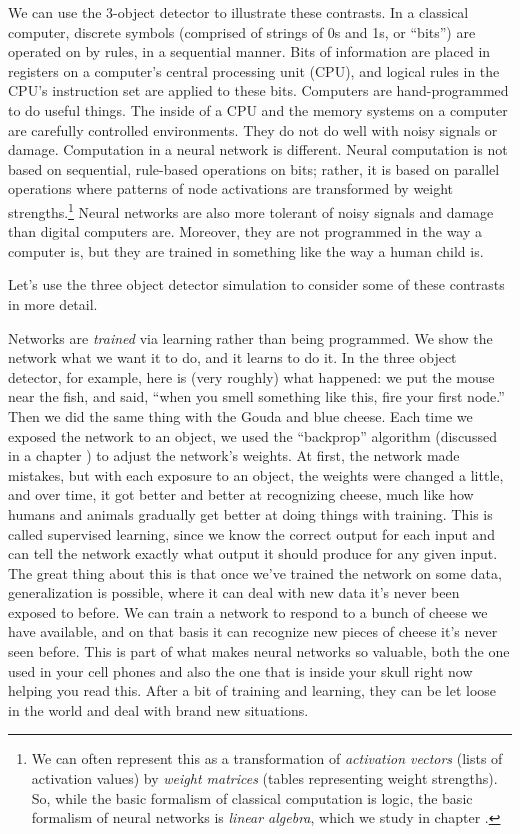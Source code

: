 We can use the 3-object detector to illustrate these contrasts. In a classical computer, discrete symbols (comprised of strings of 0s and 1s, or ``bits'') are operated on by rules, in a sequential manner. Bits of information are placed in registers on a computer's central processing unit (CPU), and logical rules in the CPU's instruction set are applied to these bits. Computers are hand-programmed to do useful things. The inside of a CPU and the memory systems on a computer are carefully controlled environments. They do not do well with noisy signals or damage. Computation in a neural network is  different. Neural computation is not based on sequential, rule-based operations on bits; rather, it is based on parallel operations where patterns of node activations are transformed by weight strengths.\footnote{We can often represent this as a transformation of \emph{activation vectors} (lists of activation values) by \emph{weight matrices} (tables representing weight strengths). So, while the basic formalism of classical computation is logic,  the basic formalism of neural networks is \emph{linear algebra}, which we study in chapter .}  Neural networks are also more tolerant of noisy signals and damage than digital computers are. Moreover, they are not programmed in the way a computer is, but they are trained in something like the way a human child is.

Let's use the three object detector simulation to consider some of these contrasts in more detail. 

Networks are \emph{trained} via learning rather than being programmed. We show the network what we want it to do, and it learns to do it. In the three object detector, for example, here is (very roughly) what happened: we put the mouse near the fish, and said, ``when you smell something like this, fire your first node.''  Then we did the same thing with the Gouda and blue cheese. Each time we exposed the network to an object, we used the ``backprop'' algorithm (discussed in a chapter ) to adjust the network's weights. At first, the network made mistakes, but with each exposure to an object, the weights were changed a little, and over time, it got better and better at recognizing cheese, much like how humans and animals gradually get better at doing things with training. This is called supervised learning, since we know the correct output for each input and can tell the network exactly what output it should produce for any given input. The great thing about this is that once we've trained the network on some data, generalization is possible, where it can deal with new data it's never been exposed to before. We can train a network to respond to a bunch of cheese we have available, and on that basis it can recognize new pieces of cheese it's never seen before. This is part of what makes neural networks so valuable, both the one used in your cell phones and also the one that is inside your skull right now helping you read this. After a bit of training and learning, they can be let loose in the world and deal with brand new situations.

